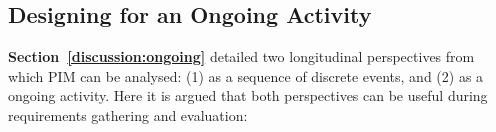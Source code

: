 \subsection{Designing for an Ongoing Activity}
\label{discussion:methodology:ongoing}

\textbf{Section~\ref{discussion:ongoing}} detailed two longitudinal perspectives from which PIM can be analysed: (1) as a sequence of discrete events, and (2) as a ongoing activity.  Here it is argued that both perspectives can be useful during requirements gathering and evaluation:
 

